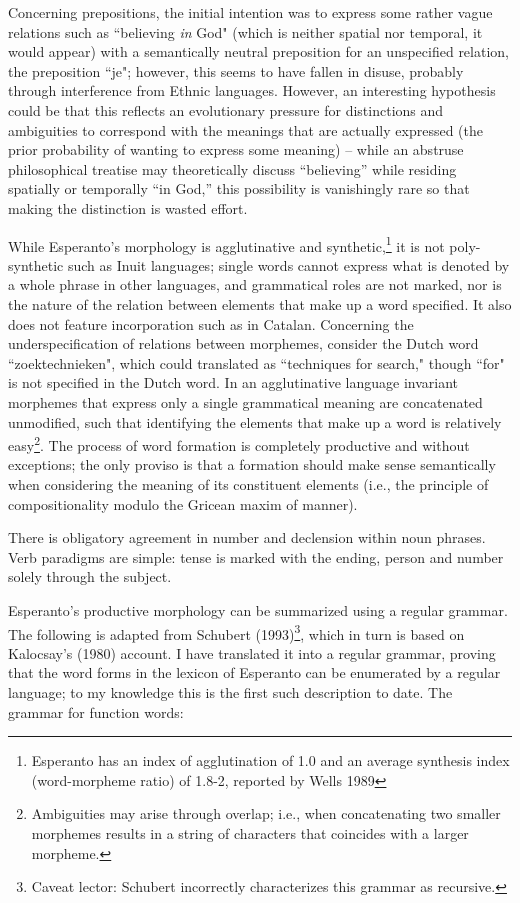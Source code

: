 \documentclass[10pt,a4paper]{article}
\begin{document}
Concerning prepositions, the initial intention was to express some rather vague
relations such as ``believing {\em in} God" (which is neither spatial nor
temporal, it would appear) with a semantically neutral preposition for an
unspecified relation, the preposition ``je"; however, this seems to have fallen
in disuse, probably through interference from Ethnic languages. However, an
interesting hypothesis could be that this reflects an evolutionary pressure for
distinctions and ambiguities to correspond with the meanings that are actually
expressed (the prior probability of wanting to express some meaning) -- while
an abstruse philosophical treatise may theoretically discuss ``believing'' while
residing spatially or temporally ``in God,'' this possibility is vanishingly rare
so that making the distinction is wasted effort.

While Esperanto's morphology is agglutinative and synthetic,\footnote{Esperanto
has an index of agglutination of 1.0 and an average synthesis index
(word-morpheme ratio) of 1.8-2, reported by Wells 1989} it is not
poly-synthetic such as Inuit languages; single words cannot express what is
denoted by a whole phrase in other languages, and grammatical roles are not
marked, nor is the nature of the relation between elements that make up a word
specified. It also does not feature incorporation such as in Catalan.
Concerning the underspecification of relations between morphemes, consider the
Dutch word ``zoektechnieken", which could translated as ``techniques for search,"
though ``for" is not specified in the Dutch word. In an agglutinative language
invariant morphemes that express only a single grammatical meaning are
concatenated unmodified, such that identifying the elements that make up a word
is relatively easy\footnote{Ambiguities may arise through overlap; i.e., when
concatenating two smaller morphemes results in a string of characters that
coincides with a larger morpheme.}. The process of word formation is completely
productive and without exceptions; the only proviso is that a formation should
make sense semantically when considering the meaning of its constituent
elements (i.e., the principle of compositionality modulo the Gricean maxim of
manner). 

There is obligatory agreement in number and declension within noun phrases.
Verb paradigms are simple: tense is marked with the ending, person and number
solely through the subject.

\newpage

Esperanto's productive morphology can be summarized using a regular
grammar. The following is adapted from Schubert (1993)\footnote{Caveat lector:
Schubert incorrectly characterizes this grammar as recursive.}, which in turn is
based on Kalocsay's (1980) account. I have translated it into a regular
grammar, proving that the word forms in the lexicon of Esperanto can be
enumerated by a regular language; to my knowledge this is the first such
description to date.  The grammar for function words: 
\end{document}
